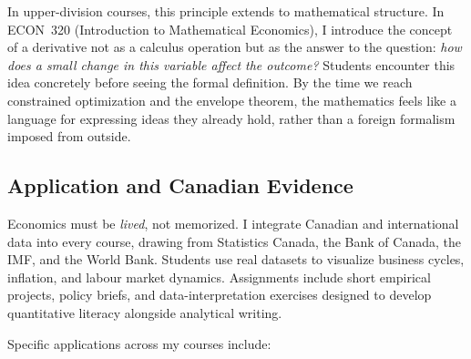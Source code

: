 \documentclass[11pt,letterpaper]{article}
\begin{document}
In upper-division courses, this principle extends to mathematical structure. In ECON~320 (Introduction to Mathematical Economics), I introduce the concept of a derivative not as a calculus operation but as the answer to the question: \textit{how does a small change in this variable affect the outcome?} Students encounter this idea concretely before seeing the formal definition. By the time we reach constrained optimization and the envelope theorem, the mathematics feels like a language for expressing ideas they already hold, rather than a foreign formalism imposed from outside.

\subsection{Application and Canadian Evidence}

Economics must be \textit{lived}, not memorized. I integrate Canadian and international data into every course, drawing from Statistics Canada, the Bank of Canada, the IMF, and the World Bank. Students use real datasets to visualize business cycles, inflation, and labour market dynamics. Assignments include short empirical projects, policy briefs, and data-interpretation exercises designed to develop quantitative literacy alongside analytical writing.

Specific applications across my courses include:
\end{document}
